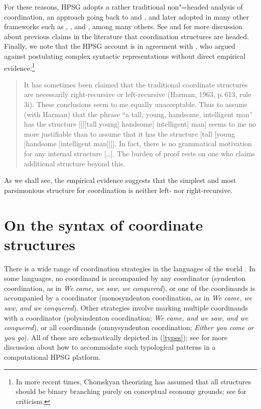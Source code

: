 For these reasons, HPSG adopts a rather traditional non"=headed analysis of coordination, an approach  going back
to \citet[195]{bloom} and  \citet[Section~4.2]{ross67}, and later adopted in many other frameworks
such as \citet[Section~3.1]{pesetsky}, \citet[]{gazdarc}, and \citet[1275]{rodney}, among many others. 
See \citet{borsley94,Borsley2005a}
and 
\citet[Chapter~2]{chavesthesis} for more discussion about previous claims in the literature that coordination structures are headed.
Finally, we note that the HPSG account is in agreement with \citet[196]{chom65}, who argued against postulating complex syntactic representations without direct empirical evidence:\footnote{In more recent times, Chomskyan theorizing has assumed that all structures should be binary branching purely on conceptual economy grounds; see \citet{Johnson:Lappin:99} for criticism.}

\begin{quote}
It has sometimes been claimed that the traditional coordinate structures are necessarily
right-recursive \citep{Yngve60a-u} or left-recursive (Harman, 1963, p.\,613, rule 3i). These conclusions seem to me equally unacceptable. Thus to assume (with Harman) that the phrase “a tall, young, handsome, intelligent man” has the structure [[[[tall young] handsome] intelligent] man] seems to me no more justifiable than to assume that it has
the structure [tall [young [handsome [intelligent man]]]]. In fact, there is no grammatical
motivation for any internal structure [\ldots]. The burden of proof rests on one who claims additional
structure beyond this. \citep[196--197]{chom65}
\end{quote}

\noindent
As we shall see, the empirical evidence suggests that
the simplest and most parsimonious structure for coordination is neither left- nor right-recursive.


\section{On the syntax of coordinate structures}


There is a wide range of coordination strategies in the languages of the world \citep{haspelmath}. In some languages, no coordinand is accompanied by any coordinator (syndenton coordination, as in \emph{We came, we saw, we conquered}), or one of the coordinands is accompanied by a coordinator (monosyndenton coordination,  as in \emph{We came, we saw, and we conquered}). Other strategies involve marking multiple coordinands with a coordinator (polysindenton coordination;
\emph{We came, and we saw, and we conquered}), or all coordinands (omnysyndenton coordination;
\emph{Either you come or you go}).
All of these are schematically depicted in (\ref{types}); see
 \citet{Drellishak:Bender:05} for more discussion about how to accommodate such typological patterns in a computational HPSG platform.

